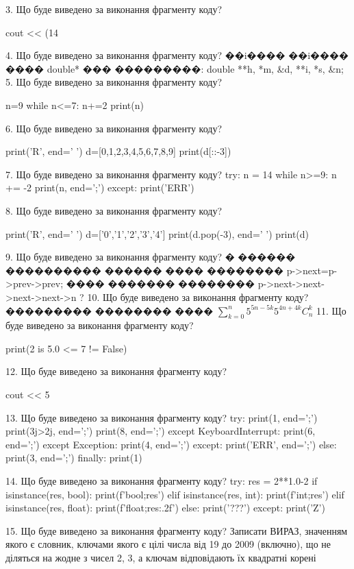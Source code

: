 \documentclass[11pt]{article}
\begin{document}
3. Що буде виведено за виконання фрагменту коду?

cout << (14 %

4. Що буде виведено за виконання фрагменту коду?
��i���� ��i���� ���� double* ��� ���������: double **h, *m, &d, **i, *s, &n;
5. Що буде виведено за виконання фрагменту коду?

n=9
while n<=7:
    n+=2
print(n)


6. Що буде виведено за виконання фрагменту коду?

print('R', end=' ')
d=[0,1,2,3,4,5,6,7,8,9]
print(d[::-3])


7. Що буде виведено за виконання фрагменту коду?
try:
    n = 14
    while n>=9:
        n += -2
    print(n, end=';')
except:
    print('ERR')

8. Що буде виведено за виконання фрагменту коду?

print('R', end=' ')
d=['0','1','2','3','4']
print(d.pop(-3), end=' ')
print(d)


9. Що буде виведено за виконання фрагменту коду?
� ������ ���������� ������ ���� �������� p->next=p->prev->prev;
���� ������� �������� p->next->next->next->next->n ?
10. Що буде виведено за виконання фрагменту коду?
��������� �������� ���� {$\sum\limits_{k=0}^{n} {{5^{5n-5k}}{5^{4n+4k}}}{C_n^k}$}
11. Що буде виведено за виконання фрагменту коду?

print(2 is 5.0 <= 7 != False)

12. Що буде виведено за виконання фрагменту коду?

cout << 5 %

13. Що буде виведено за виконання фрагменту коду?
try:
    print(1, end=';')
    print(3j>2j, end=';')
    print(8, end=';')
except KeyboardInterrupt:
    print(6, end=';')
except Exception:
    print(4, end=';')
except:
    print('ERR', end=';')
else:
    print(3, end=';')
finally:
    print(1)

14. Що буде виведено за виконання фрагменту коду?
try:
    res = 2**1.0-2
    if isinstance(res, bool):
        print(f'bool;{res}')
    elif isinstance(res, int):
        print(f'int;{res}')
    elif isinstance(res, float):
        print(f'float;{res:.2f}')
    else:
        print('???')
except:
    print('Z')

15. Що буде виведено за виконання фрагменту коду?
Записати ВИРАЗ, значенням якого є словник, ключами якого є цілі числа від 19 до 2009 (включно), що не діляться на жодне з чисел 2, 3, а ключам відповідають їх квадратні корені 
















\newpage
\end{document}
